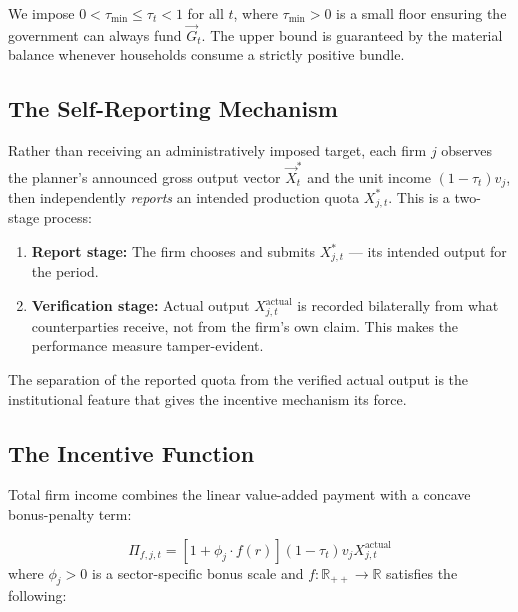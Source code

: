 \begin{assumption}\label{ass:tau-feasible}
We impose $0 < \tau_{\min} \leq \tau_t < 1$ for all $t$, where $\tau_{\min} > 0$ is a
small floor ensuring the government can always fund $\vec{G}_t$. The upper bound is
guaranteed by the material balance whenever households consume a strictly positive bundle.
\end{assumption}

\subsection{The Self-Reporting Mechanism}\label{sec:self-report}

Rather than receiving an administratively imposed target, each firm $j$ observes the
planner's announced gross output vector $\vec{X}_t^*$ and the unit income
$(1-\tau_t)v_j$, then independently \textit{reports} an intended production quota
$X_{j,t}^*$. This is a two-stage process:

\begin{enumerate}
    \item \textbf{Report stage:} The firm chooses and submits $X_{j,t}^*$ --- its
          intended output for the period.
    \item \textbf{Verification stage:} Actual output $X_{j,t}^{\text{actual}}$ is
          recorded bilaterally from what counterparties receive, not from the firm's
          own claim. This makes the performance measure tamper-evident.
\end{enumerate}

The separation of the reported quota from the verified actual output is the
institutional feature that gives the incentive mechanism its force.

\subsection{The Incentive Function}\label{sec:incentive-function}

Total firm income combines the linear value-added payment with a concave
bonus-penalty term:

\begin{equation}\label{eq:total-firm-income}
    \Pi_{f,j,t}
        =  \left[ 1 + \phi_j \cdot f(r) \right] (1-\tau_t)v_j X_{j,t}^{\text{actual}}
\end{equation}
where $\phi_j > 0$ is a sector-specific bonus scale and $f : \mathbb{R}_{++} \to
\mathbb{R}$ satisfies the following:

